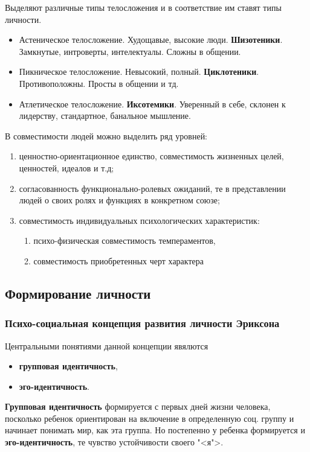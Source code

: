 Выделяют различные типы телосложения и в соответствие им ставят типы личности.
\begin{itemize}
	\item Астеническое телосложение. Худощавые, высокие люди. \textbf{Шизотеники}. Замкнутые, интроверты, интелектуалы. Сложны в общении.
	\item Пикническое телосложение. Невысокий, полный. \textbf{Циклотеники}. Противоположны. Просты в общении и тд.
	\item Атлетическое телосложение. \textbf{Иксотемики}. Уверенный в себе, склонен к лидерству, стандартное, банальное мышление.
\end{itemize}

В совместимости людей можно выделить ряд уровней:
\begin{enumerate}
	\item ценностно-ориентационное единство, совместимость жизненных целей, ценностей, идеалов и т.д;
	\item согласованность функционально-ролевых ожиданий, те в представлении людей о своих ролях и функциях в конкретном союзе;
	\item совместимость индивидуальных психологических характеристик:
		\begin{enumerate}
			\item психо-физическая совместимость темпераментов,
			\item совместимость приобретенных черт характера
		\end{enumerate}
\end{enumerate}

\subsection{Формирование личности}
\subsubsection{Психо-социальная концепция развития личности Эриксона}
Центральными понятиями данной концепции явялются 
\begin{itemize}
	\item \textbf{групповая идентичность},
	\item \textbf{эго-идентичность}.
\end{itemize}

\textbf{Групповая идентичность} формируется с первых дней жизни человека, посколько ребенок ориентирован на включение в определенную соц. группу и начинает понимать мир, как эта группа. Но постепенно у ребенка формируется и \textbf{эго-идентичность}, те чувство устойчивости своего "<я">.

